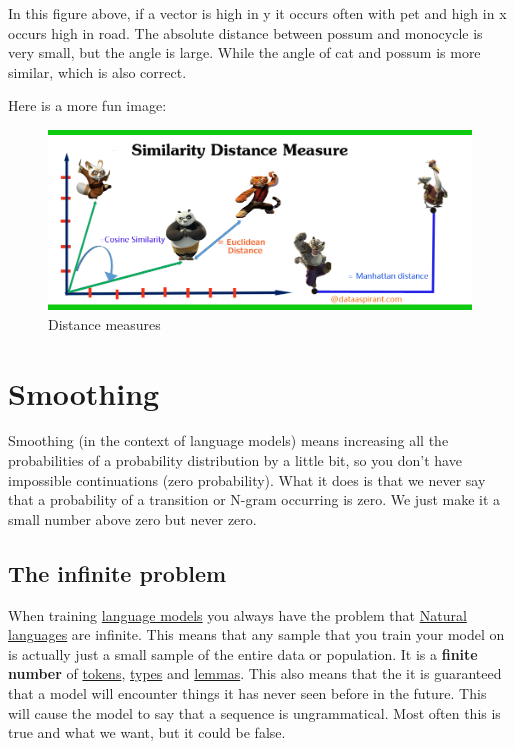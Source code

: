 \documentclass[
  11pt,
  british,
]{article}
\begin{document}
In this figure above, if a vector is high in y it occurs often with pet
and high in x occurs high in road. The absolute distance between possum
and monocycle is very small, but the angle is large. While the angle of
cat and possum is more similar, which is also correct.

Here is a more fun image:

\begin{figure}
\centering
\includegraphics{Pasted_image_20220606220120.png}
\caption{Distance measures}
\end{figure}

\hypertarget{smoothing}{%
\section{Smoothing}\label{smoothing}}

Smoothing (in the context of language models) means increasing all the
probabilities of a probability distribution by a little bit, so you
don't have impossible continuations (zero probability). What it does is
that we never say that a probability of a transition or N-gram occurring
is zero. We just make it a small number above zero but never zero.

\hypertarget{the-infinite-problem}{%
\subsection{The infinite problem}\label{the-infinite-problem}}

When training \href{Language\%20Modeling.md}{language models} you always
have the problem that
\href{../Languages/Natural\%20languages.md}{Natural languages} are
infinite. This means that any sample that you train your model on is
actually just a small sample of the entire data or population. It is a
\textbf{finite number} of \href{../Data/Token.md}{tokens},
\href{../Data/Type.md}{types} and \href{../Data/Lemma.md}{lemmas}. This
also means that the it is guaranteed that a model will encounter things
it has never seen before in the future. This will cause the model to say
that a sequence is ungrammatical. Most often this is true and what we
want, but it could be false.
\end{document}
